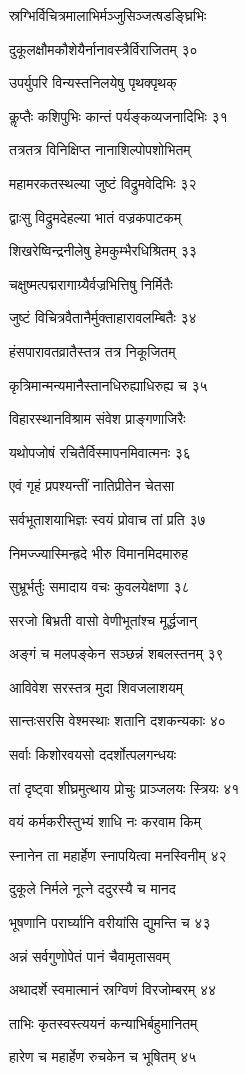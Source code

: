 स्रग्भिर्विचित्रमालाभिर्मञ्जुसिञ्जत्षडङ्घ्रिभिः

दुकूलक्षौमकौशेयैर्नानावस्त्रैर्विराजितम् ३०

उपर्युपरि विन्यस्तनिलयेषु पृथक्पृथक्

कॢप्तैः कशिपुभिः कान्तं पर्यङ्कव्यजनादिभिः ३१

तत्रतत्र विनिक्षिप्त नानाशिल्पोपशोभितम्

महामरकतस्थल्या जुष्टं विद्रुमवेदिभिः ३२

द्वाःसु विद्रुमदेहल्या भातं वज्रकपाटकम्

शिखरेष्विन्द्रनीलेषु हेमकुम्भैरधिश्रितम् ३३

चक्षुष्मत्पद्मरागाग्र्यैर्वज्रभित्तिषु निर्मितैः

जुष्टं विचित्रवैतानैर्मुक्ताहारावलम्बितैः ३४

हंसपारावतव्रातैस्तत्र तत्र निकूजितम्

कृत्रिमान्मन्यमानैस्तानधिरुह्याधिरुह्य च ३५

विहारस्थानविश्राम संवेश प्राङ्गणाजिरैः

यथोपजोषं रचितैर्विस्मापनमिवात्मनः ३६

एवं गृहं प्रपश्यन्तीं नातिप्रीतेन चेतसा

सर्वभूताशयाभिज्ञः स्वयं प्रोवाच तां प्रति ३७

निमज्ज्यास्मिन्ह्रदे भीरु विमानमिदमारुह

सुभ्रूर्भर्तुः समादाय वचः कुवलयेक्षणा ३८

सरजो बिभ्रती वासो वेणीभूतांश्च मूर्द्धजान्

अङ्गं च मलपङ्केन सञ्छन्नं शबलस्तनम् ३९

आविवेश सरस्तत्र मुदा शिवजलाशयम्

सान्तःसरसि वेश्मस्थाः शतानि दशकन्यकाः ४०

सर्वाः किशोरवयसो ददर्शोत्पलगन्धयः

तां दृष्ट्वा शीघ्रमुत्थाय प्रोचुः प्राञ्जलयः स्त्रियः ४१

वयं कर्मकरीस्तुभ्यं शाधि नः करवाम किम्

स्नानेन ता महार्हेण स्नापयित्वा मनस्विनीम् ४२

दुकूले निर्मले नूत्ने ददुरस्यै च मानद

भूषणानि परार्घ्यानि वरीयांसि द्युमन्ति च ४३

अन्नं सर्वगुणोपेतं पानं चैवामृतासवम्

अथादर्शे स्वमात्मानं स्रग्विणं विरजोम्बरम् ४४

ताभिः कृतस्वस्त्ययनं कन्याभिर्बहुमानितम्

हारेण च महार्हेण रुचकेन च भूषितम् ४५


